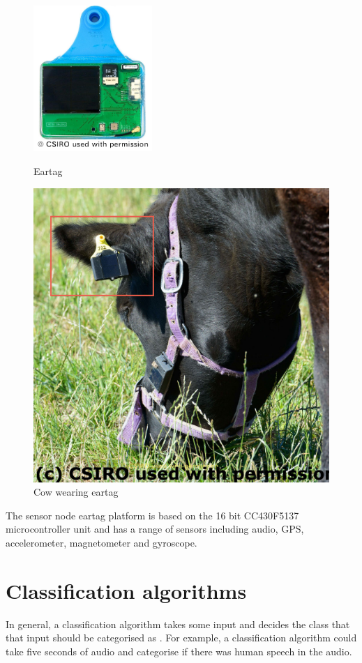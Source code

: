 \begin{figure}[ht!]
\centering
\begin{minipage}{.5\textwidth}
  \centering
  \includegraphics[width=0.4\textwidth]{images/eartag.png}
  \caption{Eartag}
  \label{eartag}
\end{minipage}%
\begin{minipage}{.5\textwidth}
  \centering
  \includegraphics[width=.5\textwidth]{images/cow.jpg}
  \caption{Cow wearing eartag}
  \label{cow}
\end{minipage}
\end{figure}

The sensor node eartag platform is based on the 16 bit CC430F5137 microcontroller unit and has a range of sensors including audio, GPS, accelerometer, magnetometer and gyroscope.

\section{Classification algorithms}
In general, a classification algorithm takes some input and decides the class that that input should be categorised as \cite{someone}. For example, a classification algorithm could take five seconds of audio and categorise if there was human speech in the audio. 

